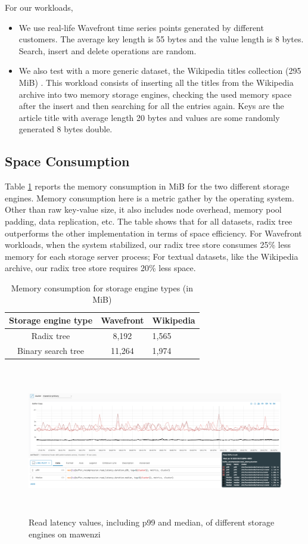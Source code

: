 \documentclass[sigplan,screen,nonacm]{acmart}
\begin{document}
For our workloads, 
\begin{itemize}
    \item We use real-life Wavefront time series points generated by different customers. The average key length is 55 bytes and the value length is 8 bytes. Search, insert and delete operations are random. 
    \item We also test with a more generic dataset, the Wikipedia titles collection (295 MiB) \cite{wikidatasets}. This workload consists of inserting all the titles from the Wikipedia archive into two memory storage engines, checking the used memory space after the insert and then searching for all the entries again. Keys are the article title  with average length 20 bytes and values are some randomly generated 8 bytes double. 
\end{itemize}

\subsection{Space Consumption}
Table \ref{tab:memory-usage} reports the memory consumption in MiB for the two different storage engines. Memory consumption here is a metric gather by the operating system. Other than raw key-value size, it also includes node overhead, memory pool padding, data replication, etc. The table shows that for all datasets, radix tree outperforms the other implementation in terms of space efficiency. For Wavefront workloads, when the system stabilized, our radix tree store consumes 25\% less memory for each storage server process; For textual datasets, like the Wikipedia archive, our radix tree store requires 20\% less space. 
\begin{table}[h]
  \caption{Memory consumption for storage engine types (in MiB)}
  \begin{tabular}{ccl}
    \toprule
    Storage engine type&Wavefront&Wikipedia\\
    \midrule
    Radix tree & 8,192 & 1,565\\
    Binary search tree & 11,264 & 1,974\\
    \bottomrule
  \end{tabular}
  \label{tab:memory-usage}
\end{table}

\begin{figure}[t]
  \centering
  \includegraphics[width=\linewidth, height=6.5cm]{pic/read latency.png}
  \setlength{\belowcaptionskip}{-8pt} 
  \caption{Read latency values, including p99 and median, of different storage engines on mawenzi}
  \label{fig:read-latency}
\end{figure}
\end{document}
